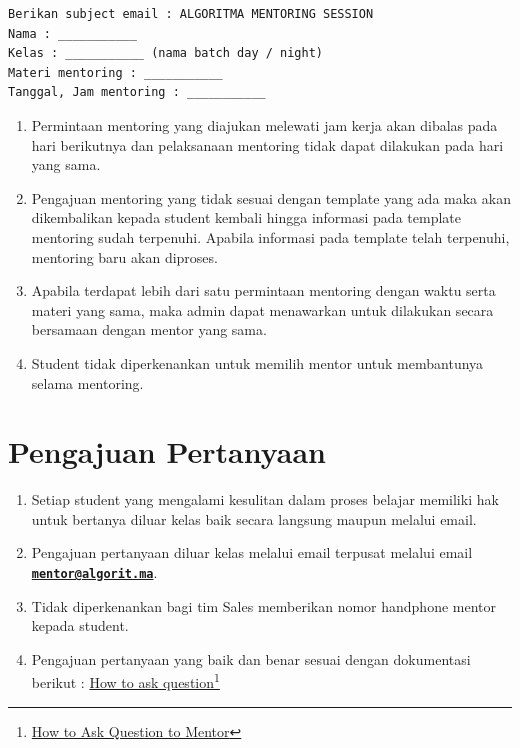 \documentclass[
]{book}
\providecommand{\tightlist}{%
  \setlength{\itemsep}{0pt}\setlength{\parskip}{0pt}}
\begin{document}
\begin{verbatim}
Berikan subject email : ALGORITMA MENTORING SESSION
Nama : ___________
Kelas : ___________ (nama batch day / night)
Materi mentoring : ___________
Tanggal, Jam mentoring : ___________
\end{verbatim}

\begin{enumerate}
\def\labelenumi{\arabic{enumi}.}
\setcounter{enumi}{3}
\tightlist
\item
  Permintaan mentoring yang diajukan melewati jam kerja akan dibalas pada hari berikutnya dan pelaksanaan mentoring tidak dapat dilakukan pada hari yang sama.
\item
  Pengajuan mentoring yang tidak sesuai dengan template yang ada maka akan dikembalikan kepada student kembali hingga informasi pada template mentoring sudah terpenuhi. Apabila informasi pada template telah terpenuhi, mentoring baru akan diproses.
\item
  Apabila terdapat lebih dari satu permintaan mentoring dengan waktu serta materi yang sama, maka admin dapat menawarkan untuk dilakukan secara bersamaan dengan mentor yang sama.
\item
  Student tidak diperkenankan untuk memilih mentor untuk membantunya selama mentoring.
\end{enumerate}

\hypertarget{pengajuan-pertanyaan}{%
\section{Pengajuan Pertanyaan}\label{pengajuan-pertanyaan}}

\begin{enumerate}
\def\labelenumi{\arabic{enumi}.}
\tightlist
\item
  Setiap student yang mengalami kesulitan dalam proses belajar memiliki hak untuk bertanya diluar kelas baik secara langsung maupun melalui email.
\item
  Pengajuan pertanyaan diluar kelas melalui email terpusat melalui email \textbf{\href{mailto:mentor@algorit.ma}{\nolinkurl{mentor@algorit.ma}}}.
\item
  Tidak diperkenankan bagi tim Sales memberikan nomor handphone mentor kepada student.
\item
  Pengajuan pertanyaan yang baik dan benar sesuai dengan dokumentasi berikut : \href{https://drive.google.com/file/d/1gWSTNF3wXK5Lbfssb-eT_A3gbnLvY_ez/view?usp=sharing}{How to ask question}\footnote{\href{https://drive.google.com/file/d/1gWSTNF3wXK5Lbfssb-eT_A3gbnLvY_ez/view?usp=sharing}{How to Ask Question to Mentor}}
\end{enumerate}
\end{document}
